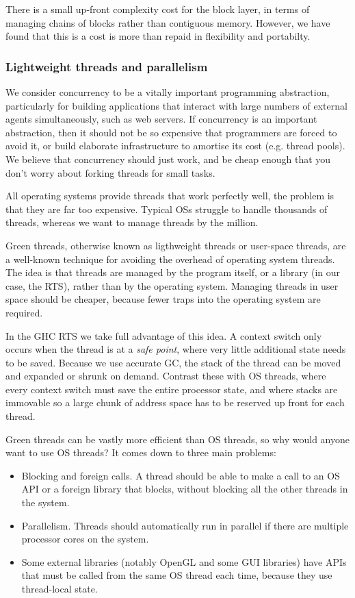 \documentclass{article}
\begin{document}
There is a small up-front complexity cost for the block layer, in
terms of managing chains of blocks rather than contiguous memory.
However, we have found that this is a cost is more than repaid in
flexibility and portabilty.

\subsubsection{Lightweight threads and parallelism}

We consider concurrency to be a vitally important programming
abstraction, particularly for building applications that interact with
large numbers of external agents simultaneously, such as web servers.
If concurrency is an important abstraction, then it should not be so
expensive that programmers are forced to avoid it, or build elaborate
infrastructure to amortise its cost (e.g. thread pools).  We believe
that concurrency should just work, and be cheap enough that you don't
worry about forking threads for small tasks.

All operating systems provide threads that work perfectly well, the
problem is that they are far too expensive.  Typical OSs struggle to
handle thousands of threads, whereas we want to manage threads by the
million.

Green threads, otherwise known as ligthweight threads or user-space
threads, are a well-known technique for avoiding the overhead of
operating system threads.  The idea is that threads are managed by the
program itself, or a library (in our case, the RTS), rather than by
the operating system.  Managing threads in user space should be
cheaper, because fewer traps into the operating system are required.

In the GHC RTS we take full advantage of this idea.  A context switch
only occurs when the thread is at a \emph{safe point}, where very
little additional state needs to be saved.  Because we use accurate
GC, the stack of the thread can be moved and expanded or shrunk on
demand.  Contrast these with OS threads, where every context switch
must save the entire processor state, and where stacks are immovable
so a large chunk of address space has to be reserved up front for
each thread.

Green threads can be vastly more efficient than OS threads, so why
would anyone want to use OS threads?  It comes down to three main
problems:

\begin{itemize}
\item Blocking and foreign calls.  A thread should be able to make a
  call to an OS API or a foreign library that blocks, without blocking
  all the other threads in the system.

\item Parallelism.  Threads should automatically run in parallel if
  there are multiple processor cores on the system.

\item Some external libraries (notably OpenGL and some GUI libraries)
  have APIs that must be called from the same OS thread each time,
  because they use thread-local state.
\end{itemize}
\end{document}
